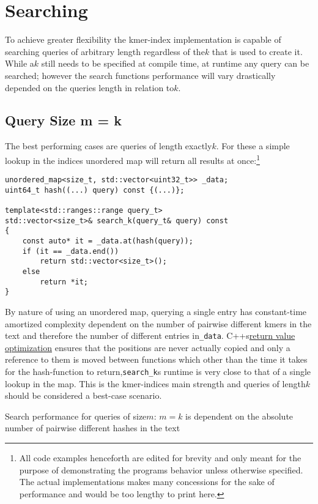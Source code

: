 \chapter{Searching}

To achieve greater flexibility the kmer-index implementation is capable
of searching queries of arbitrary length regardless of the$k$ that
is used to create it. While a$k$ still needs to be specified at compile
time, at runtime any query can be searched; however the search functions
performance will vary drastically depended on the queries length in
relation to$k$.

\section{\label{section 3.1}Query Size m = k}

The best performing cases are queries of length exactly$k$. For these
a simple lookup in the indices unordered map will return all results
at once:\footnote{All code examples henceforth are edited for brevity and only meant
for the purpose of demonstrating the programs behavior unless otherwise
specified. The actual implementations makes many concessions for the
sake of performance and would be too lengthy to print here.}
\begin{lyxcode}
\begin{lstlisting}[caption={Search function for queries of size k.},language={[GNU]C++},tabsize=4]
unordered_map<size_t, std::vector<uint32_t>> _data;
uint64_t hash((...) query) const {(...)};

template<std::ranges::range query_t>
std::vector<size_t>& search_k(query_t& query) const
{
	const auto* it = _data.at(hash(query));
	if (it == _data.end())
		return std::vector<size_t>();
	else
		return *it;
}
\end{lstlisting}

\end{lyxcode}
By nature of using an unordered map, querying a single entry has constant-time
amortized complexity dependent on the number of pairwise different
kmers in the text and therefore the number of different entries in\lstinline{_data}.
C++s\href{https://en.cppreference.com/w/cpp/language/copy_elision}{return value optimization}
ensures that the positions are never actually copied and only a reference
to them is moved between functions which other than the time it takes
for the hash-function to return,\lstinline{search_k}s runtime is
very close to that of a single lookup in the map. This is the kmer-indices
main strength and queries of length$k$ should be considered a best-case
scenario.
\begin{lem}
\label{Lemma 1}Search performance for queries of size$m:\,m=k$ is
dependent on the absolute number of pairwise different hashes in the
text
\end{lem}

